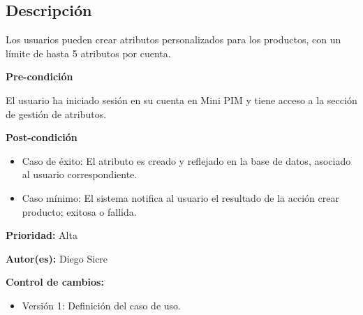 

\subsection*{Descripción}
Los usuarios pueden crear atributos personalizados para los productos, con un límite de hasta 5 atributos por cuenta.
\vspace{0.15cm}

\textbf{Pre-condición}\par
El usuario ha iniciado sesión en su cuenta en Mini PIM y tiene acceso a la sección de gestión de atributos.\par
\vspace{0.15cm}

\textbf{Post-condición}
\begin{itemize}
    \item Caso de éxito: El atributo es creado y reflejado en la base de datos, asociado al usuario correspondiente.
    \item Caso mínimo: El sistema notifica al usuario el resultado de la acción crear producto; exitosa o fallida.
\end{itemize}

\textbf{Prioridad: }
Alta
\vspace{0.15cm}

\textbf{Autor(es): }
Diego Sicre\par
\vspace{0.15cm}

\textbf{Control de cambios: }
\begin{itemize}
    \item Versión 1: Definición del caso de uso.
\end{itemize}


